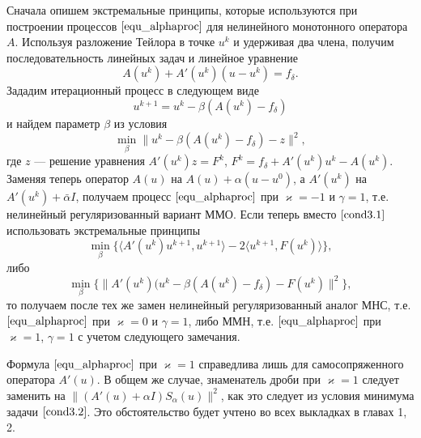 Сначала опишем экстремальные принципы, которые используются при построении процессов $\eqref{equ_alphaproc}$ для нелинейного монотонного оператора $A$. Используя разложение Тейлора в точке $u^k$ и удерживая два члена, получим последовательность линейных задач и линейное уравнение
\begin{equation*}
A(u^k)+A'(u^k)(u-u^k)=f_{\delta}.
\end{equation*}
Зададим итерационный процесс в следующем виде
\begin{equation*}
u^{k+1}=u^k-\beta(A(u^k)-f_{\delta})
\end{equation*}
и найдем параметр $\beta$ из условия
\begin{equation}\label{cond3.1}
\min_{\beta}{\|u^k-\beta(A(u^k)-f_{\delta})-z\|^2},
\end{equation}
где $z$ --- решение уравнения $A'(u^k)z=F^k$, $F^k=f_{\delta}+A'(u^k)u^k-A(u^k)$. Заменяя теперь оператор $A(u)$ на $A(u)+\alpha(u-u^0)$, а $A'(u^k)$ на $A'(u^k)+\bar\alpha I$, получаем процесс $\eqref{equ_alphaproc}$ при $\varkappa=-1$ и $\gamma=1$, т.е. нелинейный регуляризованный вариант ММО. Если теперь вместо $\eqref{cond3.1}$ использовать экстремальные принципы
$$\min_{\beta}\{\langle A'(u^k)u^{k+1},u^{k+1}\rangle-2\langle u^{k+1},F(u^k)\rangle\},$$
либо 
\begin{equation}\label{cond3.2}
\min_{\beta}\{\|A'(u^k)(u^k-\beta(A(u^k)-f_{\delta})-F(u^k)\|^2\},
\end{equation}
то получаем после тех же замен нелинейный регуляризованный аналог МНС, т.е. $\eqref{equ_alphaproc}$ при $\varkappa=0$ и $\gamma=1$, либо ММН, т.е. $\eqref{equ_alphaproc}$ при $\varkappa=1$, $\gamma=1$ с учетом следующего замечания.

\begin{remark}
	Формула $\eqref{equ_alphaproc}$ при $\varkappa=1$ справедлива лишь для самосопряженного оператора $A'(u)$. В общем же случае, знаменатель дроби при $\varkappa=1$ следует заменить на $\|(A'(u)+\alpha I)S_\alpha (u)\|^2$, как это следует из условия минимума задачи $\eqref{cond3.2}$. Это обстоятельство будет учтено во всех выкладках в главах 1, 2.
\end{remark}

